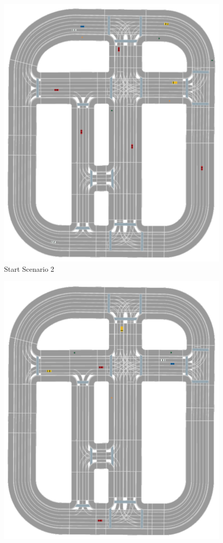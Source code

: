 \begin{figure}[ht]
\begin{minipage}[b]{0.43\linewidth}
		\includegraphics[width=1\linewidth]{figures/start_scenarios/scenario_2} 
		Start Scenario 2
	\end{minipage} 
	\begin{minipage}[b]{0.43\linewidth}
		\centering
		\includegraphics[width=1\linewidth]{figures/start_scenarios/scenario_3} 

\end{minipage}
\end{figure}
